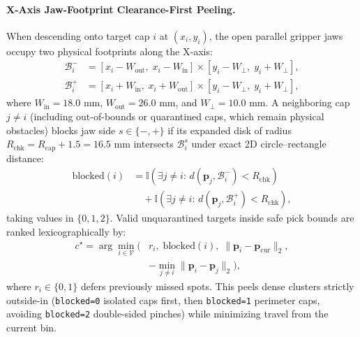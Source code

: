 \documentclass[10pt,twocolumn,letterpaper]{article}
\begin{document}
\paragraph{X-Axis Jaw-Footprint Clearance-First Peeling.}
When descending onto target cap $i$ at $(x_i, y_i)$, the open parallel gripper jaws occupy two physical footprints along the X-axis:
\begin{equation}
  \begin{aligned}
    \mathcal{B}_i^{-} &= [x_i - W_{\mathrm{out}},\; x_i - W_{\mathrm{in}}] \times [y_i - W_{\perp},\; y_i + W_{\perp}], \\
    \mathcal{B}_i^{+} &= [x_i + W_{\mathrm{in}},\; x_i + W_{\mathrm{out}}] \times [y_i - W_{\perp},\; y_i + W_{\perp}],
  \end{aligned}
  \label{eq:jaw_boxes}
\end{equation}
where $W_{\mathrm{in}}=18.0\text{ mm}$, $W_{\mathrm{out}}=26.0\text{ mm}$, and $W_{\perp}=10.0\text{ mm}$. A neighboring cap $j \neq i$ (including out-of-bounds or quarantined caps, which remain physical obstacles) blocks jaw side $s \in \{-,+\}$ if its expanded disk of radius $R_{\mathrm{chk}} = R_{\mathrm{cap}} + 1.5 = 16.5\text{ mm}$ intersects $\mathcal{B}_i^{s}$ under exact 2D circle--rectangle distance:
\begin{equation}
  \begin{aligned}
    \mathrm{blocked}(i) &= \mathbb{I}\!\left(\exists j\neq i:\, d(\mathbf{p}_j, \mathcal{B}_i^{-}) < R_{\mathrm{chk}}\right) \\
                        &\quad + \mathbb{I}\!\left(\exists j\neq i:\, d(\mathbf{p}_j, \mathcal{B}_i^{+}) < R_{\mathrm{chk}}\right),
  \end{aligned}
  \label{eq:blocked}
\end{equation}
taking values in $\{0,1,2\}$. Valid unquarantined targets inside safe pick bounds are ranked lexicographically by:
\begin{equation}
  \begin{aligned}
    c^\star = \arg\min_{i \in \mathcal{V}} \Big(& r_i,\; \mathrm{blocked}(i),\; \|\mathbf{p}_i - \mathbf{p}_{\mathrm{cur}}\|_2, \\
                                                & -\min_{j\neq i}\|\mathbf{p}_i - \mathbf{p}_j\|_2 \Big),
  \end{aligned}
  \label{eq:selector}
\end{equation}
where $r_i \in \{0,1\}$ defers previously missed spots. This peels dense clusters strictly outside-in (\texttt{blocked=0} isolated caps first, then \texttt{blocked=1} perimeter caps, avoiding \texttt{blocked=2} double-sided pinches) while minimizing travel from the current bin.
\end{document}
